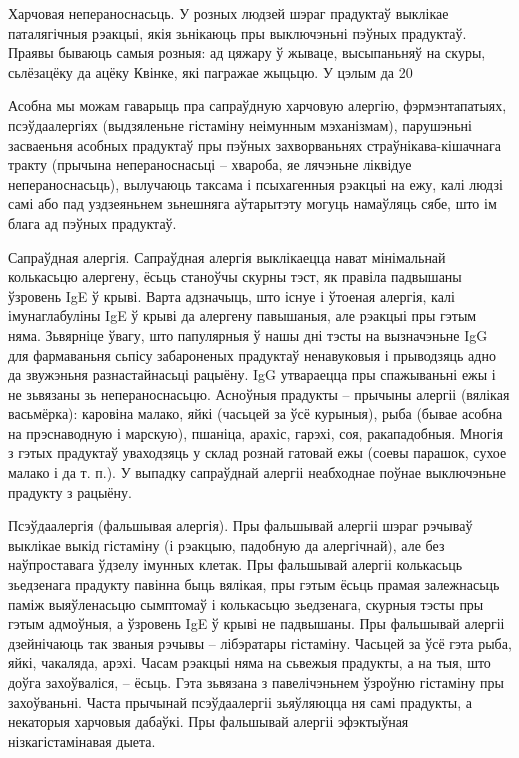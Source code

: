 Харчовая непераноснасьць. 
У розных людзей шэраг прадуктаў выклікае паталягічныя рэакцыі, якія зьнікаюць пры выключэньні пэўных прадуктаў. Праявы бываюць самыя розныя: ад цяжару ў жываце, высыпаньняў на скуры, сьлёзацёку да ацёку Квінке, які пагражае жыцьцю. У цэлым да 20%

Асобна мы можам гаварыць пра сапраўдную харчовую алергію, фэрмэнтапатыях, псэўдаалергіях (выдзяленьне гістаміну неімунным мэханізмам), парушэньні засваеньня асобных прадуктаў пры пэўных захворваньнях страўнікава-кішачнага тракту (прычына непераноснасьці – хвароба, яе лячэньне ліквідуе непераноснасьць), вылучаюць таксама і псыхагенныя рэакцыі на ежу, калі людзі самі або пад уздзеяньнем зьнешняга аўтарытэту могуць намаўляць сябе, што ім блага ад пэўных прадуктаў.

Сапраўдная алергія.
Сапраўдная алергія выклікаецца нават мінімальнай колькасьцю алергену, ёсьць станоўчы скурны тэст, як правіла падвышаны ўзровень IgE ў крыві. Варта адзначыць, што існуе і ўтоеная алергія, калі імунаглабуліны IgE ў крыві да алергену павышаныя, але рэакцыі пры гэтым няма. Зьвярніце ўвагу, што папулярныя ў нашы дні тэсты на вызначэньне IgG для фармаваньня сьпісу забароненых прадуктаў ненавуковыя і прыводзяць адно да звужэньня разнастайнасьці рацыёну. IgG утвараецца пры спажываньні ежы і не зьвязаны зь непераноснасьцю. Асноўныя прадукты – прычыны алергіі (вялікая васьмёрка): каровіна малако, яйкі (часьцей за ўсё курыныя), рыба (бывае асобна на прэснаводную і марскую), пшаніца, арахіс, гарэхі, соя, ракападобныя. Многія з гэтых прадуктаў уваходзяць у склад рознай гатовай ежы (соевы парашок, сухое малако і да т. п.). У выпадку сапраўднай алергіі неабходнае поўнае выключэньне прадукту з рацыёну.

Псэўдаалергія (фальшывая алергія).
Пры фальшывай алергіі шэраг рэчываў выклікае выкід гістаміну (і рэакцыю, падобную да алергічнай), але без наўпроставага ўдзелу імунных клетак. Пры фальшывай алергіі колькасьць зьедзенага прадукту павінна быць вялікая, пры гэтым ёсьць прамая залежнасьць паміж выяўленасьцю сымптомаў і колькасьцю зьедзенага, скурныя тэсты пры гэтым адмоўныя, а ўзровень IgE ў крыві не падвышаны. Пры фальшывай алергіі дзейнічаюць так званыя рэчывы – лібэратары гістаміну. Часьцей за ўсё гэта рыба, яйкі, чакаляда, арэхі. Часам рэакцыі няма на сьвежыя прадукты, а на тыя, што доўга захоўваліся, – ёсьць. Гэта зьвязана з павелічэньнем ўзроўню гістаміну пры захоўваньні. Часта прычынай псэўдаалергіі зьяўляюцца ня самі прадукты, а некаторыя харчовыя дабаўкі. Пры фальшывай алергіі эфэктыўная нізкагістамінавая дыета.

